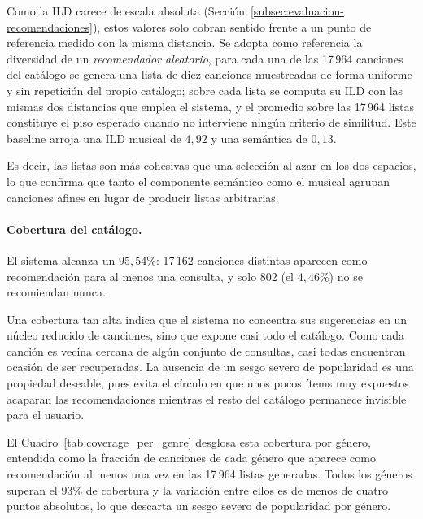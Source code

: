 Como la ILD carece de escala absoluta (Sección~\ref{subsec:evaluacion-recomendaciones}), estos valores solo cobran sentido frente a un punto de referencia medido con la misma distancia. Se adopta como referencia la diversidad de un \textit{recomendador aleatorio}, para cada una de las 17\,964 canciones del catálogo se genera una lista de diez canciones muestreadas de forma uniforme y sin repetición del propio catálogo; sobre cada lista se computa su ILD con las mismas dos distancias que emplea el sistema, y el promedio sobre las 17\,964 listas constituye el piso esperado cuando no interviene ningún criterio de similitud. Este baseline arroja una ILD musical de $4{,}92$ y una semántica de $0{,}13$.

Es decir, las listas son más cohesivas que una selección al azar en los dos espacios, lo que confirma que tanto el componente semántico como el musical agrupan canciones afines en lugar de producir listas arbitrarias.

\paragraph{Cobertura del catálogo.} El sistema alcanza un $95{,}54\%$: 17\,162 canciones distintas aparecen como recomendación para al menos una consulta, y solo 802 (el $4{,}46\%$) no se recomiendan nunca.

Una cobertura tan alta indica que el sistema no concentra sus sugerencias en un núcleo reducido de canciones, sino que expone casi todo el catálogo. Como cada canción es vecina cercana de algún conjunto de consultas, casi todas encuentran ocasión de ser recuperadas. La ausencia de un sesgo severo de popularidad es una propiedad deseable, pues evita el círculo en que unos pocos ítems muy expuestos acaparan las recomendaciones mientras el resto del catálogo permanece invisible para el usuario.

El Cuadro~\ref{tab:coverage_per_genre} desglosa esta cobertura por género, entendida como la fracción de canciones de cada género que aparece como recomendación al menos una vez en las 17\,964 listas generadas. Todos los géneros superan el 93\% de cobertura y la variación entre ellos es de menos de cuatro puntos absolutos, lo que descarta un sesgo severo de popularidad por género.



